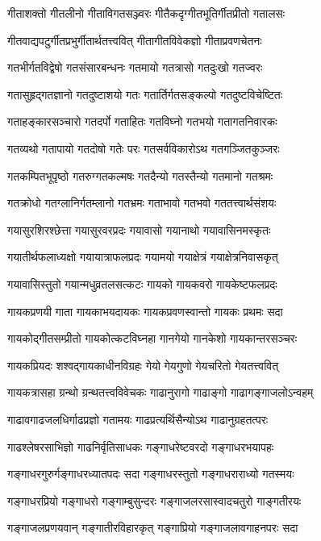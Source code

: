 \twolineshloka
{गीताशक्तो गीतलीनो गीताविगतसञ्ज्वरः}%
{गीतैकदृग्गीतभूतिर्गीतप्रीतो गतालसः}%

\twolineshloka
{गीतवाद्यपटुर्गीतप्रभुर्गीतार्थतत्त्ववित्}%
{गीतागीतविवेकज्ञो गीताप्रवणचेतनः}%

\twolineshloka
{गतभीर्गतविद्वेषो गतसंसारबन्धनः}%
{गतमायो गतत्रासो गतदुःखो गतज्वरः}%

\twolineshloka
{गतासुहृद्गतज्ञानो गतदुष्टाशयो गतः}%
{गतार्तिर्गतसङ्कल्पो गतदुष्टविचेष्टितः}%

\twolineshloka
{गताहङ्कारसञ्चारो गतदर्पो गताहितः}%
{गतविघ्नो गतभयो गतागतनिवारकः}%

\twolineshloka
{गतव्यथो गतापायो गतदोषो गतेः परः}%
{गतसर्वविकारोऽथ गतगञ्जितकुञ्जरः}%

\twolineshloka
{गतकम्पितभूपृष्ठो गतरुग्गतकल्मषः}%
{गतदैन्यो गतस्तैन्यो गतमानो गतश्रमः}%

\twolineshloka
{गतक्रोधो गतग्लानिर्गतम्लानो गतभ्रमः}%
{गताभावो गतभवो गततत्त्वार्थसंशयः}%

\twolineshloka
{गयासुरशिरश्छेत्ता गयासुरवरप्रदः}%
{गयावासो गयानाथो गयावासिनमस्कृतः}%

\twolineshloka
{गयातीर्थफलाध्यक्षो गयायात्राफलप्रदः}%
{गयामयो गयाक्षेत्रं गयाक्षेत्रनिवासकृत्}%

\twolineshloka
{गयावासिस्तुतो गयान्मधुव्रतलसत्कटः}%
{गायको गायकवरो गायकेष्टफलप्रदः}%

\twolineshloka
{गायकप्रणयी गाता गायकाभयदायकः}%
{गायकप्रवणस्वान्तो गायकः प्रथमः सदा}%

\twolineshloka
{गायकोद्गीतसम्प्रीतो गायकोत्कटविघ्नहा}%
{गानगेयो गानकेशो गायकान्तरसञ्चरः}%

\twolineshloka
{गायकप्रियदः शश्वद्गायकाधीनविग्रहः}%
{गेयो गेयगुणो गेयचरितो गेयतत्त्ववित्}%

\twolineshloka
{गायकत्रासहा ग्रन्थो ग्रन्थतत्त्वविवेचकः}%
{गाढानुरागो गाढाङ्गो गाढागङ्गाजलोऽन्वहम्}%

\twolineshloka
{गाढावगाढजलधिर्गाढप्रज्ञो गतामयः}%
{गाढप्रत्यर्थिसैन्योऽथ गाढानुग्रहतत्परः}%

\twolineshloka
{गाढश्लेषरसाभिज्ञो गाढनिर्वृतिसाधकः}%
{गङ्गाधरेष्टवरदो गङ्गाधरभयापहः}%

\twolineshloka
{गङ्गाधरगुरुर्गङ्गाधरध्यातपदः सदा}
{गङ्गाधरस्तुतो गङ्गाधराराध्यो गतस्मयः}%

\twolineshloka
{गङ्गाधरप्रियो गङ्गाधरो गङ्गाम्बुसुन्दरः}%
{गङ्गाजलरसास्वादचतुरो गाङ्गतीरयः}%

\twolineshloka
{गङ्गाजलप्रणयवान् गङ्गातीरविहारकृत्}%
{गङ्गाप्रियो गङ्गाजलावगाहनपरः सदा}%

